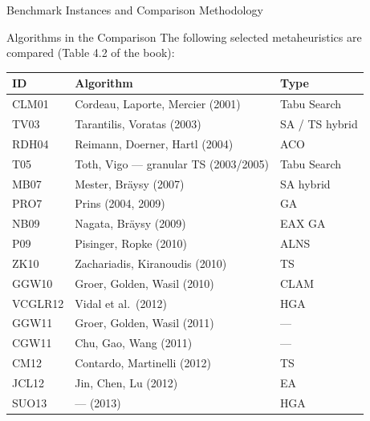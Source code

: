 \documentclass[aspectratio=169,10pt]{beamer}
\begin{document}
\begin{frame}[allowframebreaks]{Benchmark Instances and Comparison Methodology}
  \begin{block}{Algorithms in the Comparison}
    The following selected metaheuristics are compared (Table 4.2 of
    the book):
    \smallskip
    \begin{center}
    \small
    \begin{tabular}{lll}
      \toprule
      ID & Algorithm & Type \\
      \midrule
      CLM01 & Cordeau, Laporte, Mercier (2001) & Tabu Search \\
      TV03  & Tarantilis, Voratas (2003) & SA / TS hybrid \\
      RDH04 & Reimann, Doerner, Hartl (2004) & ACO \\
      T05   & Toth, Vigo --- granular TS (2003/2005) & Tabu Search \\
      MB07  & Mester, Br\"aysy (2007) & SA hybrid \\
      PRO7  & Prins (2004, 2009) & GA \\
      NB09  & Nagata, Br\"aysy (2009) & EAX GA \\
      P09   & Pisinger, Ropke (2010) & ALNS \\
      ZK10  & Zachariadis, Kiranoudis (2010) & TS \\
      GGW10 & Groer, Golden, Wasil (2010) & CLAM \\
      VCGLR12 & Vidal et al.\ (2012) & HGA \\
      GGW11 & Groer, Golden, Wasil (2011) & --- \\
      CGW11 & Chu, Gao, Wang (2011) & --- \\
      CM12  & Contardo, Martinelli (2012) & TS \\
      JCL12 & Jin, Chen, Lu (2012) & EA \\
      SUO13 & --- (2013) & HGA \\
      \bottomrule
    \end{tabular}
    \end{center}
  \end{block}

\end{frame}
\end{document}
